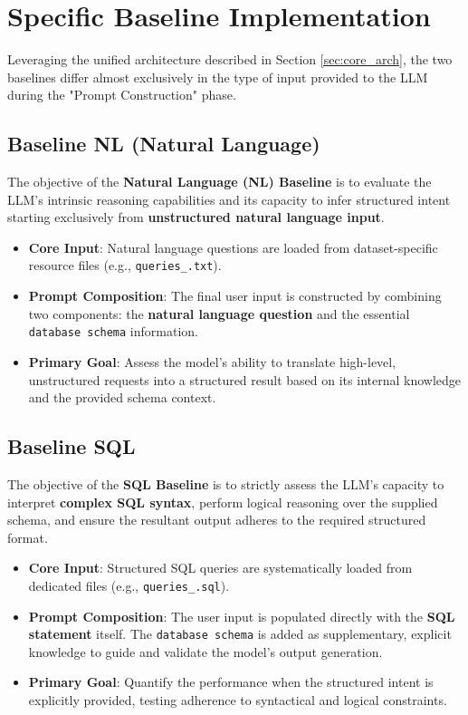 \section{Specific Baseline Implementation}
\label{sec:Baselines}
Leveraging the unified architecture described in Section \ref{sec:core_arch}, the two baselines differ almost exclusively in the type of input provided to the LLM during the "Prompt Construction" phase.
\vspace{2em}
\subsection{Baseline NL (Natural Language)}

The objective of the \textbf{Natural Language (NL) Baseline} is to evaluate the LLM's intrinsic reasoning capabilities and its capacity to infer structured intent starting exclusively from \textbf{unstructured natural language input}.

\begin{itemize}[leftmargin=*]
    \item \textbf{Core Input}: Natural language questions are loaded from dataset-specific resource files (e.g., \texttt{queries\_<dataset-name>.txt}).
    \item \textbf{Prompt Composition}: The final user input is constructed by combining two components: the \textbf{natural language question} and the essential \texttt{database schema} information.
    \item \textbf{Primary Goal}: Assess the model's ability to translate high-level, unstructured requests into a structured result based on its internal knowledge and the provided schema context.
\end{itemize}
\vspace{2em}
\subsection{Baseline SQL}

The objective of the \textbf{SQL Baseline} is to strictly assess the LLM's capacity to interpret \textbf{complex SQL syntax}, perform logical reasoning over the supplied schema, and ensure the resultant output adheres to the required structured format.

\begin{itemize}[leftmargin=*]
    \item \textbf{Core Input}: Structured SQL queries are systematically loaded from dedicated files (e.g., \texttt{queries\_<dataset-name>.sql}).
    \item \textbf{Prompt Composition}: The user input is populated directly with the \textbf{SQL statement} itself. The \texttt{database schema} is added as supplementary, explicit knowledge to guide and validate the model's output generation.
    \item \textbf{Primary Goal}: Quantify the performance when the structured intent is explicitly provided, testing adherence to syntactical and logical constraints.
\end{itemize}
\newpage
